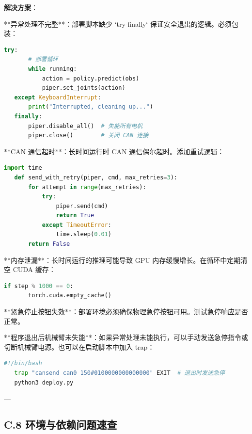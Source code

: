 \documentclass[UTF8,a4paper,11pt]{ctexart}
\begin{document}
{\textbf{解决方案}：
\item[1] **异常处理不完整**：部署脚本缺少 `try-finally` 保证安全退出的逻辑。必须包装：
\begin{lstlisting}[language=python]
   try:
       # 部署循环
       while running:
           action = policy.predict(obs)
           piper.set_joints(action)
   except KeyboardInterrupt:
       print("Interrupted, cleaning up...")
   finally:
       piper.disable_all()  # 失能所有电机
       piper.close()        # 关闭 CAN 连接
\end{lstlisting}
\item[2] **CAN 通信超时**：长时间运行时 CAN 通信偶尔超时。添加重试逻辑：
\begin{lstlisting}[language=python]
   import time
   def send_with_retry(piper, cmd, max_retries=3):
       for attempt in range(max_retries):
           try:
               piper.send(cmd)
               return True
           except TimeoutError:
               time.sleep(0.01)
       return False
\end{lstlisting}
\item[3] **内存泄漏**：长时间运行的推理可能导致 GPU 内存缓慢增长。在循环中定期清空 CUDA 缓存：
\begin{lstlisting}[language=python]
   if step % 1000 == 0:
       torch.cuda.empty_cache()
\end{lstlisting}
\item[4] **紧急停止按钮失效**：部署环境必须确保物理急停按钮可用。测试急停响应是否正常。
\item[5] **程序退出后机械臂未失能**：如果异常处理未能执行，可以手动发送急停指令或切断机械臂电源。也可以在启动脚本中加入 trap：
\begin{lstlisting}[language=bash]
   #!/bin/bash
   trap "cansend can0 150#0100000000000000" EXIT  # 退出时发送急停
   python3 deploy.py
\end{lstlisting}

---

\subsection{C.8 环境与依赖问题速查}

}
\end{document}
